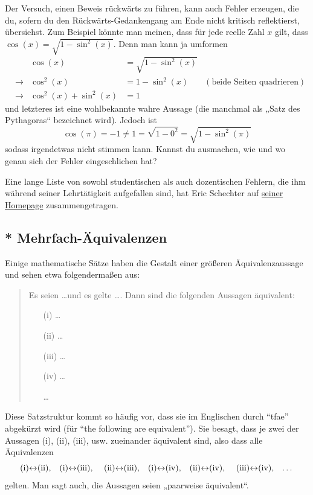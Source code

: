 \begin{bem}
    Der Versuch, einen Beweis rückwärts zu führen, kann auch Fehler erzeugen, die du, sofern du den Rückwärts-Gedankengang am Ende nicht kritisch reflektierst, übersiehst. Zum Beispiel könnte man meinen, dass für jede reelle Zahl $x$ gilt, dass $\cos(x)=\sqrt{1-\sin^2(x)}$. Denn man kann ja umformen
    \begin{align*}
        &&\cos(x)& =\sqrt{1-\sin^2(x)} \\
        & \to & \cos^2(x)& = 1-\sin^2(x) & (\text{beide Seiten quadrieren}) \\
        & \to & \cos^2(x) + \sin^2(x) &= 1
    \end{align*}
    und letzteres ist eine wohlbekannte wahre Aussage (die manchmal als „Satz des Pythagoras“ bezeichnet wird). Jedoch ist
        \[ \cos(\pi) = -1 \neq 1 = \sqrt{1-0^2} = \sqrt{1-\sin^2(\pi)} \]
    sodass irgendetwas nicht stimmen kann. Kannst du ausmachen, wie und wo genau sich der Fehler eingeschlichen hat?
\end{bem}


\begin{bem}
 Eine lange Liste von sowohl studentischen als auch dozentischen Fehlern, die ihm während seiner Lehrtätigkeit aufgefallen sind, hat Eric Schechter auf \href{https://math.vanderbilt.edu/schectex/commerrs/}{seiner Homepage} zusammengetragen.
\end{bem}





\subsection*{* Mehrfach-Äquivalenzen}


\begin{de} \label{def:tfae}
    Einige mathematische Sätze haben die Gestalt einer größeren Äquivalenzaussage und sehen etwa folgendermaßen aus:
    \begin{quote}
        Es seien \dots und es gelte \dots. Dann sind die folgenden Aussagen äquivalent:
        \begin{itemize}
            \item[(i)] \dots
            \item[(ii)] \dots
            \item[(iii)] \dots
            \item[(iv)] \dots
            \item[\dots]
        \end{itemize}
    \end{quote}
    Diese Satzstruktur kommt so häufig vor, dass sie im Englischen durch ``tfae'' abgekürzt wird (für ``the following are equivalent''). Sie besagt, dass je zwei der Aussagen (i), (ii), (iii), usw. zueinander äquivalent sind, also dass alle Äquivalenzen
        \[ \text{(i)$\leftrightarrow$(ii),\quad (i)$\leftrightarrow$(iii), \quad (ii)$\leftrightarrow$(iii),\quad (i)$\leftrightarrow$(iv),\quad (ii)$\leftrightarrow$(iv), \quad (iii)$\leftrightarrow$(iv),\quad \dots} \]
    gelten. Man sagt auch, die Aussagen seien „paarweise äquivalent“.
 \end{de}
 
